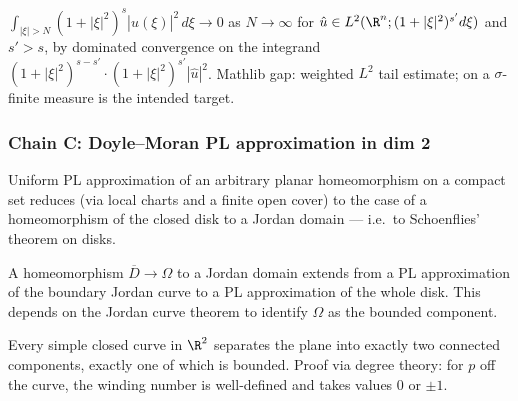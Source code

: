 \begin{lemma}
\label{lem:rk-r5-tail-decay}
$\int_{|\xi| > N} (1+|\xi|^{2})^{s} |\hat u(\xi)|^{2}\,d\xi
\to 0$ as $N \to \infty$ for $\hat u \in L^{2}(\R^{n};
(1+|\xi|^{2})^{s'} d\xi)$ and $s' > s$, by dominated
convergence on the integrand $(1+|\xi|^{2})^{s-s'} \cdot
(1+|\xi|^{2})^{s'} |\hat u|^{2}$.  Mathlib gap: weighted
$L^{2}$ tail estimate;
 on a
$\sigma$-finite measure is the intended target.
\leanok
\end{lemma}

\subsubsection*{Chain C: Doyle--Moran PL approximation in dim 2}

\begin{lemma}
\label{lem:rado-dim2-r1-disk-schoenflies}
Uniform PL approximation of an arbitrary planar homeomorphism
on a compact set reduces (via local charts and a finite open
cover) to the case of a homeomorphism of the closed disk to a
Jordan domain --- i.e.\ to Schoenflies' theorem on disks.
\leanok
\end{lemma}

\begin{lemma}
\label{lem:rado-dim2-r2-schoenflies-jordan}
A homeomorphism $\overline{D} \to \Omega$ to a Jordan domain
extends from a PL approximation of the boundary Jordan curve to
a PL approximation of the whole disk.  This depends on the
Jordan curve theorem to identify $\Omega$ as the bounded
component.
\leanok
\end{lemma}

\begin{lemma}
\label{lem:rado-dim2-r3-jordan-curve-theorem}
Every simple closed curve in $\R^{2}$ separates the plane into
exactly two connected components, exactly one of which is
bounded.  Proof via degree theory: for $p$ off the curve, the
winding number is well-defined and takes values $0$ or $\pm 1$.
\leanok
\end{lemma}

